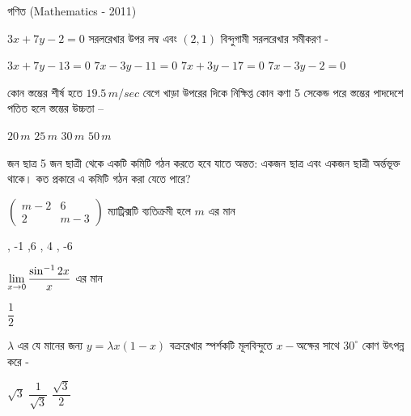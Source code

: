 \documentclass[addpoints]{exam}
\begin{document}
\begin{LARGE}
\begin{center}
গণিত (Mathematics - 2011)
\end{center}
\end{LARGE}
\begin{questions}

 \question  $ 3x+7y-2=0 $ সরলরেখার উপর লম্ব এবং $ (2,1) $ বিন্দুগামী সরলরেখার সমীকরণ -

\begin{oneparchoices}
\choice $ 3x+7y-13=0 $
\choice $ 7x-3y-11=0 $
\choice $ 7x+3y-17=0 $
\choice $ 7x-3y-2 =0 $
\end{oneparchoices}

\question  কোন স্তম্ভের শীর্ষ হতে $ 19.5\,m/sec $ বেগে খাড়া উপরের দিকে নিক্ষিপ্ত কোন কণা 5 সেকেন্ড পরে স্তম্ভের পাদদেশে পতিত হলে স্তম্ভের উচ্চতা – 

\begin{oneparchoices}
\choice $ 20\,m$
\choice $ 25\,m$
\choice $ 30\,m $
\choice $ 50\,m $
\end{oneparchoices}

 জন ছাত্র 5 জন ছাত্রী থেকে একটি কমিটি গঠন করতে হবে যাতে অন্তত: একজন ছাত্র এবং একজন ছাত্রী অর্ন্তভূক্ত থাকে। কত প্রকারে এ কমিটি গঠন করা যেতে পারে?

\begin{oneparchoices}

\end{oneparchoices}

\question  $\begin{pmatrix}
m-2 & 6 \\
2 & m-3
\end{pmatrix} $ ম্যাট্রিক্সটি ব্যতিক্রমী হলে $ m $ এর মান

\begin{oneparchoices}
, -1
,6
, 4
, -6
\end{oneparchoices}

\question  $ \mathlarger{\lim_{x\to 0} \dfrac{\sin^{-1}2x}{x}} $ এর মান

\begin{oneparchoices}
\choice $ \dfrac{1}{2} $
\end{oneparchoices}

\question  $ \lambda $ এর যে মানের জন্য $ y=\lambda x(1-x) $ বক্ররেখার স্পর্শকটি মূলবিন্দুতে $ x- $অক্ষের সাথে $ 30^{\circ} $ কোণ উৎপন্ন করে -

\begin{oneparchoices}
\choice $ \sqrt{3} $
\choice $ \dfrac{1}{\sqrt{3}} $
\choice  $ \dfrac{\sqrt{3}}{2} $


\end{oneparchoices}
\end{questions}
\end{document}
